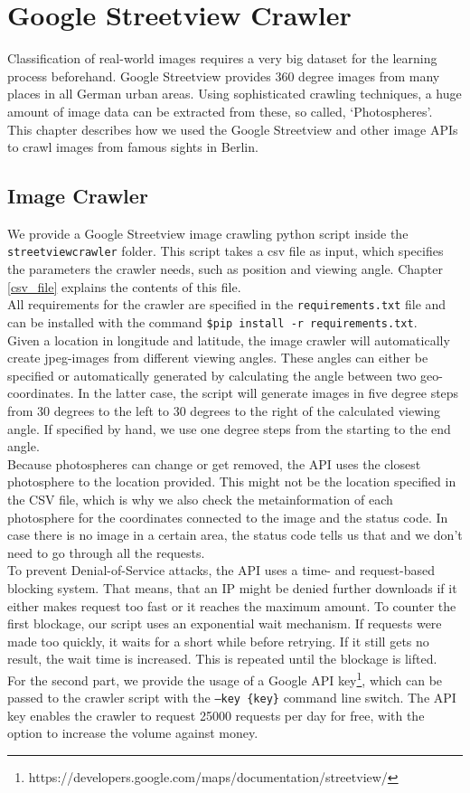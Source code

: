 \section{Google Streetview Crawler}
Classification of real-world images requires a very big dataset for the learning process beforehand. Google Streetview provides 360 degree images from many places in all German urban areas. Using sophisticated crawling techniques, a huge amount of image data can be extracted from these, so called, `Photospheres'.\\
This chapter describes how we used the Google Streetview and other image APIs to crawl images from famous sights in Berlin.

\subsection{Image Crawler}
We provide a Google Streetview image crawling python script inside the \texttt{streetviewcrawler} folder. This script takes a csv file as input, which specifies the parameters the crawler needs, such as position and viewing angle. Chapter \ref{csv_file} explains the contents of this file.\\
All requirements for the crawler are specified in the \texttt{requirements.txt} file and can be installed with the command \texttt{\$pip install -r requirements.txt}.\\
Given a location in longitude and latitude, the image crawler will automatically create jpeg-images from different viewing angles. These angles can either be specified or automatically generated by calculating the angle between two geo-coordinates. In the latter case, the script will generate images in five degree steps from 30 degrees to the left to 30 degrees to the right of the calculated viewing angle. If specified by hand, we use one degree steps from the starting to the end angle.\\
Because photospheres can change or get removed, the API uses the closest photosphere to the location provided. This might not be the location specified in the CSV file, which is why we also check the metainformation of each photosphere for the coordinates connected to the image and the status code. In case there is no image in a certain area, the status code tells us that and we don't need to go through all the requests.\\
To prevent Denial-of-Service attacks, the API uses a time- and request-based blocking system. That means, that an IP might be denied further downloads if it either makes request too fast or it reaches the maximum amount. To counter the first blockage, our script uses an exponential wait mechanism. If requests were made too quickly, it waits for a short while before retrying. If it still gets no result, the wait time is increased. This is repeated until the blockage is lifted.\\
For the second part, we provide the usage of a Google API key\footnote{https://developers.google.com/maps/documentation/streetview/}, which can be passed to the crawler script with the \texttt{--key \{key\}} command line switch. The API key enables the crawler to request 25000 requests per day for free, with the option to increase the volume against money.

